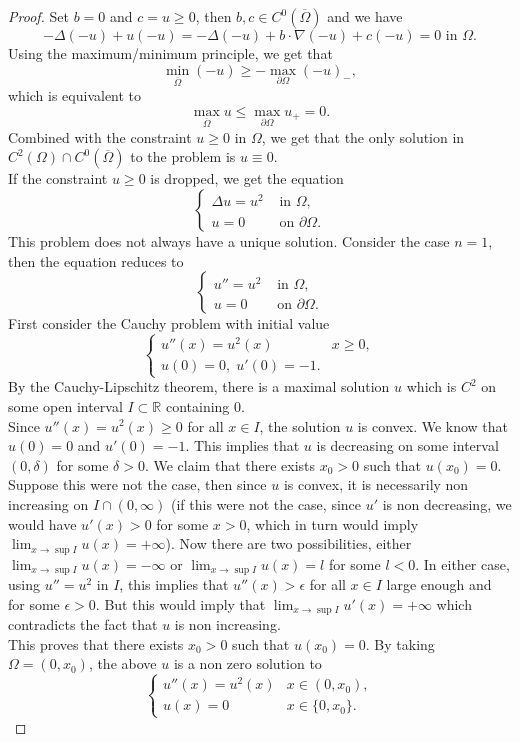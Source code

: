 \documentclass{article}
\newcommand{\R}{\mathbb{R}}
\begin{document}
\begin{proof}
    Set $b=0$ and $c=u\geqslant 0$, then $b,c\in C^0(\overline{\Omega})$ and we have
    \[
    -\Delta(-u)+u(-u)=-\Delta(-u) +b\cdot\nabla(-u)+c(-u)=0\text{ in }\Omega.
    \]
    Using the maximum/minimum principle, we get that 
    \[
    \min_{\overline{\Omega}}(-u)\geqslant-\max_{\partial \Omega}(-u)_-,
    \]
    which is equivalent to
    \[
    \max_{\overline{\Omega}} u\leqslant \max_{\partial\Omega}u_+=0.
    \]
    Combined with the constraint $u\geqslant 0$ in $\Omega$, we get that the only solution in $C^2(\Omega)\cap C^0(\overline{\Omega})$ to the problem is $u\equiv 0$.\\
   If the constraint $u\geqslant 0$ is dropped, we get the equation
   \[
   \begin{cases}
       \Delta u=u^2&\text{ in }\Omega,\\
       u=0&\text{ on }\partial\Omega.
   \end{cases}
   \]
   This problem does not always have a unique solution. Consider the case $n=1$, then the equation reduces to 
   \[
   \begin{cases}
        u''=u^2&\text{ in }\Omega,\\
        u=0&\text{ on }\partial\Omega.
   \end{cases}
   \]
   First consider the Cauchy problem with initial value
   \[
   \begin{cases}
        u''(x)=u^2(x)&x\geqslant 0,\\
        u(0)=0,\; u'(0)=-1.
   \end{cases}
   \]
   By the Cauchy-Lipschitz theorem, there is a maximal solution $u$ which is $C^2$ on some open interval $I\subset\R$ containing $0$.\\
   Since $u''(x)=u^2(x)\geqslant 0$ for all $x\in I$, the solution $u$ is convex. We know that $u(0)=0$ and $u'(0)=-1$. This implies that $u$ is decreasing on some interval $(0,\delta)$ for some $\delta>0$. We claim that there exists $x_0>0$ such that $u(x_0)=0$. Suppose this were not the case, then since $u$ is convex, it is necessarily non increasing on $I\cap (0,\infty)$ (if this were not the case, since $u'$ is non decreasing, we would have $u'(x)>0$ for some $x>0$, which in turn would imply $\lim_{x\to\sup I}u(x)=+\infty$). Now there are two possibilities, either $\lim_{x\to\sup I}u(x)=-\infty$ or $\lim_{x\to\sup I}u(x)=l$ for some $l<0$. In either case, using $u''=u^2$ in $I$, this implies that $u''(x)>\epsilon$ for all $x\in I$ large enough and for some $\epsilon>0$. But this would imply that $\lim_{x\to\sup I}u'(x)=+\infty$ which contradicts the fact that $u$ is non increasing.\\
   This proves that there exists $x_0>0$ such that $u(x_0)=0$. By taking $\Omega=(0,x_0)$, the above $u$ is a non zero solution to
   \[
   \begin{cases}
       u''(x)=u^2(x) & x\in(0,x_0),\\
       u(x)=0&x\in\{0,x_0\}.
   \end{cases}
   \]
\end{proof}
\end{document}
